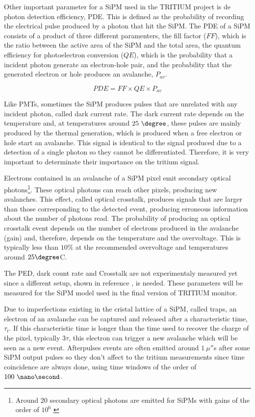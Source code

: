 Other important parameter for a SiPM used in the TRITIUM project is de photon detection efficiency, PDE. This is defined as the probability of recording the electrical pulse produced by a photon that hit the SiPM. The PDE of a SiPM consists of a product of three different paramenters, the fill factor ($FF$), which is the ratio between the active area of the SiPM and the total area, the quantum efficiency for photoelectron conversion ($QE$), which is the probability that a incident photon generate an electron-hole pair, and the probability that the generated electron or hole produces an avalanche, $P_{av}$.

\begin{equation}
PDE=FF \times QE \times P_{av}
\label{PDE_SiPM}
\end{equation}

Like PMTs, sometimes the SiPM produces pulses that are unrelated with any incident photon, called dark current rate. The dark current rate depends on the temperature and, at temperatures around $25~\degree$, these pulses are mainly produced by the thermal generation, which is produced when a free electron or hole start an avalanche. This signal is identical to the signal produced due to a detection of a single photon so they cannot be differentiated. Therefore, it is very important to determinate their importance on the tritium signal.

Electrons contained in an avalanche of a SiPM pixel emit secondary optical photons\footnote{Around 20 secondary optical photons are emitted for SiPMs with gains of the order of $10^6$ \cite{CrosstalkProbability}}. These optical photons can reach other pixels, producing new avalanches. This effect, called optical crosstalk, produces signals that are larger than those corresponding to the detected event, producing erroneous information about the number of photons read. The probability of producing an optical crosstalk event depends on the number of electrons produced in the avalanche (gain) and, therefore, depends on the temperature and the overvoltage. This is typically less than $10\%$ at the recommended overvoltage and temperatures around $25\degree$C.

The PED, dark count rate and Crosstalk are not experimentaly measured yet since a different setup, shown in reference \cite{PDEStudy}, is needed. These parameters will be measured for the SiPM model used in the final version of TRITIUM monitor.

Due to imperfections existing in the cristal lattice of a SiPM, called traps, an electron of an avalanche can be captured and released after a characteristic time, $\tau_t$. If this characteristic time is longer than the time used to recover the charge of the pixel, typically $3\tau$, this electron can trigger a new avalanche which will be seen as a new event. Afterpulses events are often emitted around $1~\mu\second$s after some SiPM output pulses so they don't affect to the tritium measurements since time coincidence are always done, using time windows of the order of $100~\nano\second$.

